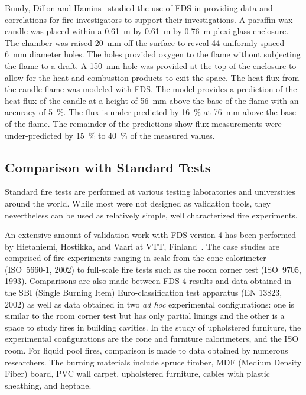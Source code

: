 Bundy,  Dillon and  Hamins~\cite{Dillon:1,Hamins:FPE2005}  studied the use of FDS  in providing data and correlations  for fire investigators to
support their investigations.   A paraffin  wax candle  was placed within  a  0.61~m by  0.61~m  by  0.76~m  plexi-glass enclosure.   The chamber was
raised 20~mm off the surface to reveal 44 uniformly spaced 6~mm diameter holes.   The holes provided oxygen to  the flame without subjecting the
flame to a draft.   A 150~mm hole was  provided at the top of the enclosure to allow  for the heat and combustion products to exit the space.  The
heat flux  from the candle flame was modeled with FDS.  The model  provides a prediction of the heat  flux of the candle at a height of  56~mm above
the base of the flame  with an accuracy of 5~\%. The flux is under predicted  by 16~\% at 76~mm above the base of the  flame. The remainder  of the
predictions show  flux measurements were under-predicted by 15~\% to 40~\% of the measured values.



\subsection{Comparison with Standard Tests}

Standard fire tests are  performed at various testing laboratories and universities  around  the world.   While  most  were  not designed  as
validation tools, they nevertheless  can be used as relatively simple, well characterized fire experiments.

An extensive  amount of  validation work with  FDS version 4  has been performed    by   Hietaniemi,    Hostikka,   and    Vaari    at   VTT,
Finland~\cite{Hietaniemi:1}.  The  case studies are  comprised of fire experiments ranging  in scale  from the cone  calorimeter (ISO~5660-1, 2002)
to full-scale fire tests such as the room corner test (ISO~9705, 1993).  Comparisons are  also  made  between FDS  4  results and  data obtained  in
the  SBI (Single  Burning Item)  Euro-classification test apparatus (EN  13823, 2002) as  well as data  obtained in two  {\em ad hoc} experimental
configurations: one is  similar to the  room corner test but  has only partial linings and  the other is a  space to study fires in building
cavities. In the study of upholstered furniture, the experimental configurations  are the cone  and furniture calorimeters, and the  ISO room. For
liquid  pool fires, comparison is  made to data obtained  by  numerous  researchers.   The burning  materials  include spruce  timber, MDF  (Medium
Density  Fiber) board,  PVC  wall carpet, upholstered furniture, cables with plastic sheathing, and heptane.

